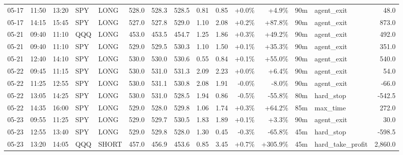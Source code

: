 \documentclass[11pt,a4paper,twoside]{article}
\begin{document}
\begin{landscape}
\begin{center}
\begin{longtable}{>{\color{txtmain}}l l l l l r r r r r r r r >{\color{txtmain}}l r}
05-17 & 11:50 & 13:20 & SPY & LONG & 528.0 & 528.3 & 528.5 & 0.81 & 0.85 & \textcolor{wingreen}{+0.0\%} & \textcolor{wingreen}{+4.9\%} & 90m & agent\_exit & \textcolor{wingreen}{48.0} \\
05-17 & 14:15 & 15:45 & SPY & LONG & 527.0 & 527.8 & 529.0 & 1.10 & 2.08 & \textcolor{wingreen}{+0.2\%} & \textcolor{wingreen}{+87.8\%} & 90m & agent\_exit & \textcolor{wingreen}{873.0} \\
05-21 & 09:40 & 11:10 & QQQ & LONG & 453.0 & 453.5 & 454.7 & 1.25 & 1.86 & \textcolor{wingreen}{+0.3\%} & \textcolor{wingreen}{+49.2\%} & 90m & agent\_exit & \textcolor{wingreen}{492.0} \\
05-21 & 09:40 & 11:10 & SPY & LONG & 529.0 & 529.5 & 530.3 & 1.10 & 1.50 & \textcolor{wingreen}{+0.1\%} & \textcolor{wingreen}{+35.3\%} & 90m & agent\_exit & \textcolor{wingreen}{351.0} \\
05-21 & 12:40 & 14:10 & SPY & LONG & 530.0 & 530.0 & 530.6 & 0.55 & 0.84 & \textcolor{wingreen}{+0.1\%} & \textcolor{wingreen}{+55.0\%} & 90m & agent\_exit & \textcolor{wingreen}{540.0} \\
05-22 & 09:45 & 11:15 & SPY & LONG & 530.0 & 531.0 & 531.3 & 2.09 & 2.23 & \textcolor{wingreen}{+0.0\%} & \textcolor{wingreen}{+6.4\%} & 90m & agent\_exit & \textcolor{wingreen}{54.0} \\
05-22 & 11:25 & 12:55 & SPY & LONG & 530.0 & 531.1 & 530.8 & 2.08 & 1.91 & \textcolor{lossred}{-0.0\%} & \textcolor{lossred}{-8.0\%} & 90m & agent\_exit & \textcolor{lossred}{-66.0} \\
05-22 & 13:05 & 14:25 & SPY & LONG & 530.0 & 531.0 & 528.5 & 1.94 & 0.86 & \textcolor{lossred}{-0.5\%} & \textcolor{lossred}{-55.8\%} & 80m & hard\_stop & \textcolor{lossred}{-542.5} \\
05-22 & 14:35 & 16:00 & SPY & LONG & 529.0 & 528.0 & 529.8 & 1.06 & 1.74 & \textcolor{wingreen}{+0.3\%} & \textcolor{wingreen}{+64.2\%} & 85m & max\_time & \textcolor{wingreen}{272.0} \\
05-23 & 09:55 & 11:25 & SPY & LONG & 529.0 & 529.7 & 530.5 & 1.83 & 1.89 & \textcolor{wingreen}{+0.1\%} & \textcolor{wingreen}{+3.3\%} & 90m & agent\_exit & \textcolor{wingreen}{30.0} \\
05-23 & 12:55 & 13:40 & SPY & LONG & 529.0 & 529.8 & 528.0 & 1.30 & 0.45 & \textcolor{lossred}{-0.3\%} & \textcolor{lossred}{-65.8\%} & 45m & hard\_stop & \textcolor{lossred}{-598.5} \\
05-23 & 13:20 & 14:05 & QQQ & SHORT & 457.0 & 456.9 & 453.6 & 0.85 & 3.45 & \textcolor{wingreen}{+0.7\%} & \textcolor{wingreen}{+305.9\%} & 45m & hard\_take\_profit & \textcolor{wingreen}{2,860.0} \\

\end{longtable}
\end{center}
\end{landscape}
\end{document}
